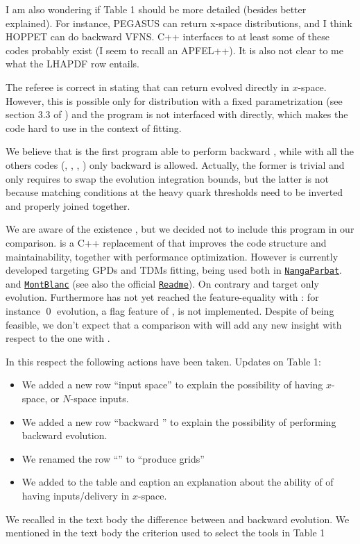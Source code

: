 \documentclass[a4paper,11pt]{article}
\begin{document}
\begin{response}{I am also wondering if Table 1 should be more detailed (besides better
explained). For instance, PEGASUS can return x-space distributions, and I think
HOPPET can do backward VFNS. C++ interfaces to at least some of these codes
probably exist (I seem to recall an APFEL++). It is also not clear to me what
the LHAPDF row entails.}

The referee is correct in stating that \pegasus{} can return evolved \pdfs directly in 
$x$-space. However, this is possible only for distribution with a fixed parametrization
(see section 3.3 of \cite{Vogt:2004ns}) and the program is not interfaced with \lhapdf{} 
directly, which makes the code hard to use in the context of \pdfs fitting.

We believe that \eko{} is the first program able to perform backward \vfns{}, while
with all the others codes (\apfel{}, \qcdnum{}, \pegasus{}, \hoppet{}) only backward \ffns{}
is allowed. Actually, the former is trivial and only requires to swap the
evolution integration bounds, but the latter is not because matching conditions at 
the heavy quark thresholds need to be inverted and properly joined together.

We are aware of the existence \apfelpp{}, but we decided not to include this program
in our comparison. \apfelpp{} is a C++ replacement of \apfel{}
that improves the code structure and maintainability, 
together with performance optimization.
However is currently developed targeting GPDs and TDMs fitting, being used both in 
\href{https://github.com/MapCollaboration/NangaParbat}{\texttt{NangaParbat}}. 
and \href{https://github.com/MapCollaboration/MontBlanc}{\texttt{MontBlanc}}
(see also the official \apfelpp{} \href{https://github.com/vbertone/apfelxx}{\texttt{Readme}}).
On contrary \apfel{} and \eko{} target only \pdfs evolution.
Furthermore \apfelpp{} has not yet reached the feature-equality with \apfel{}:
for instance \qed{} evolution, a flag feature of \apfel{}, is not implemented. 
Despite of being feasible, we don't expect that a comparison with \apfelpp{}
will add any new insight with respect to the one with \apfel{}.

In this respect the following actions have been taken. Updates on Table 1: 
\begin{itemize}
 \item We added a new row \enquote{input space} to explain the possibility of
 having $x$-space, or $N$-space \pdfs inputs.
 \item We added a new row \enquote{backward \ffns{}} to explain the possibility of
 performing \ffns{} backward evolution.
 \item We renamed the row \enquote{\lhapdf{}} to \enquote{produce \lhapdf{} grids}
 \item We added to the table and caption an explanation about the ability of \pegasus{} 
 of having inputs/delivery in $x$-space.
\end{itemize}
We recalled in the text body the difference between \ffns{} and \vfns{} backward evolution.
We mentioned in the text body the criterion used to select the tools in Table 1
\end{response}
\end{document}
